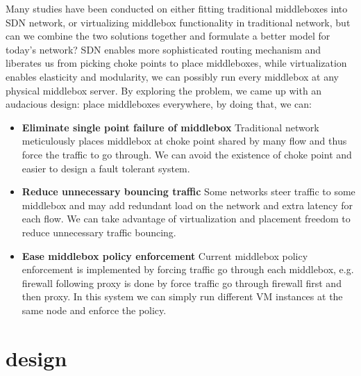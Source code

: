 \documentclass{sig-alternate}
\begin{document}
Many studies have been conducted on either fitting traditional middleboxes into SDN network\cite{SIMPLE2013,FLOWTAGS2014}, or virtualizing middlebox functionality in traditional network\cite{ANANTA2013,APLOMB2012}, but can we combine the two solutions together and formulate a better model for today's network? SDN enables more sophisticated routing mechanism and liberates us from picking choke points to place middleboxes, while virtualization enables elasticity and modularity, we can possibly run every middlebox at any physical middlebox server. By exploring the problem, we came up with an audacious design: place middleboxes everywhere, by doing that, we can:
\begin{itemize}
  \item \textbf{Eliminate single point failure of middlebox}
  \newline
  Traditional network meticulously places middlebox at choke point shared by many flow and thus force the traffic to go through. We can avoid the existence of choke point and easier to design a fault tolerant system.
    \item \textbf{Reduce unnecessary bouncing traffic} 
  \newline
  Some networks steer traffic to some middlebox and may add redundant load on the network and extra latency for each flow. We can take advantage of virtualization and placement freedom to reduce unnecessary traffic bouncing. 
  \item \textbf{Ease middlebox policy enforcement}
\newline
Current middlebox policy enforcement is implemented by forcing traffic go through each middlebox, e.g. firewall following proxy is done by force traffic go through firewall first and then proxy. In this system we can simply run different VM instances at the same node and enforce the policy. 
\end{itemize}

\section{design}
\end{document}
